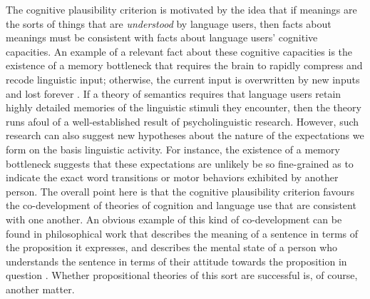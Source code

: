 The cognitive plausibility criterion is motivated by the idea that if meanings are the sorts of things that are \textit{understood} by language users, then facts about meanings must be consistent with facts about language users' cognitive capacities. An example of a relevant fact about these cognitive capacities is the existence of a memory bottleneck that requires the brain to rapidly compress and recode linguistic input; otherwise, the current input is overwritten by new inputs and lost forever \citep{Christiansen:2015}. If a theory of semantics requires that language users retain highly detailed memories of the linguistic stimuli they encounter, then the theory runs afoul of a well-established result of psycholinguistic research. However, such research can also suggest new hypotheses about the nature of the expectations we form on the basis linguistic activity. For instance, the existence of a memory bottleneck suggests that these expectations are unlikely be so fine-grained as to indicate the exact word transitions or motor behaviors exhibited by another person. The overall point here is that the cognitive plausibility criterion favours the co-development of theories of cognition and language use that are consistent with one another. An obvious example of this kind of co-development can be found in philosophical work that describes the meaning of a sentence in terms of the proposition it expresses, and describes the mental state of a person who understands the sentence in terms of their attitude towards the proposition in question \citep[][Ch. 5]{Dennett:1987}. Whether propositional theories of this sort are successful is, of course, another matter.

